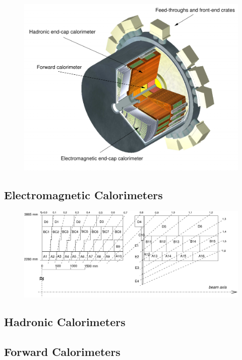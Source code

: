 \begin{figure}[hbtp]
\includegraphics[width=\fullfig]{figures/calo_endcap_overview.pdf}
\caption{}
\label{fig:calo_endcap_overview}
\end{figure}


\subsection{Electromagnetic Calorimeters}

\begin{figure}[hbtp]
\includegraphics[width=\fullfig]{figures/tile_segmentation.pdf}
\caption{}
\label{fig:tile_segmentation}
\end{figure}


\subsection{Hadronic Calorimeters}

\subsection{Forward Calorimeters}

